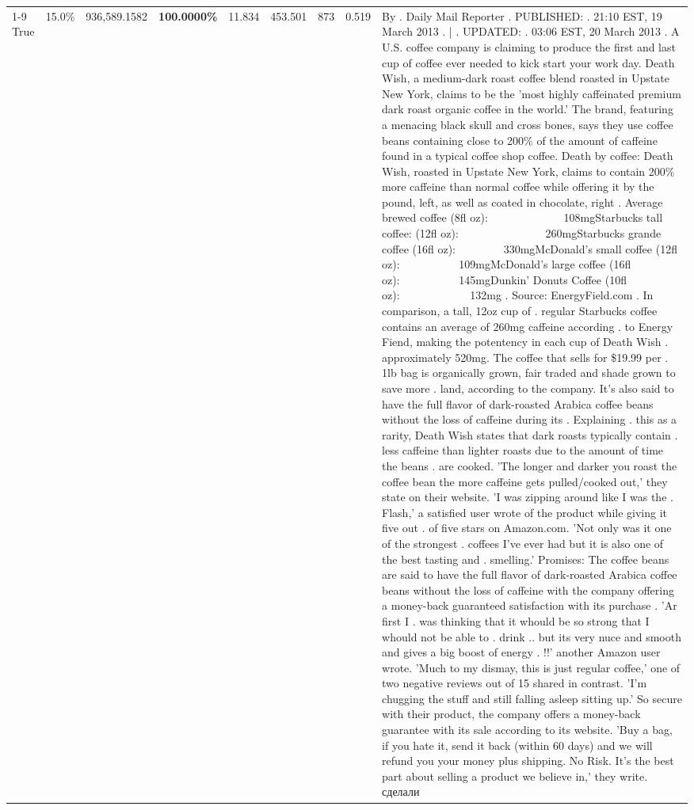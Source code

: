 \begin{table}[H]
{\begin{tabular}{lllrlllll}
\cline{1-9}
True & 15.0\% & 936,589.1582 & \bfseries \color{red} 100.0000\% & 11.834 & 453.501 & 873 & 0.519 & By . Daily Mail Reporter . PUBLISHED: . 21:10 EST, 19 March 2013 . | . UPDATED: . 03:06 EST, 20 March 2013 . A U.S. coffee company is claiming to produce the first and last cup of coffee ever needed to kick start your work day. Death Wish, a medium-dark roast coffee blend roasted in Upstate New York, claims to be the 'most highly caffeinated premium dark roast organic coffee in the world.' The brand, featuring a menacing black skull and cross bones, says they use coffee beans containing close to 200\% of the amount of caffeine found in a typical coffee shop coffee. Death by coffee: Death Wish, roasted in Upstate New York, claims to contain 200\% more caffeine than normal coffee while offering it by the pound, left, as well as coated in chocolate, right . Average brewed coffee (8fl oz):              108mgStarbucks tall coffee: (12fl oz):                260mgStarbucks grande coffee (16fl oz):         330mgMcDonald's small coffee (12fl oz):           109mgMcDonald's large coffee (16fl oz):           145mgDunkin' Donuts Coffee (10fl oz):             132mg . Source: EnergyField.com . In comparison, a tall, 12oz cup of . regular Starbucks coffee contains an average of 260mg caffeine according . to Energy Fiend, making the potentency in each cup of Death Wish . approximately 520mg. The coffee that sells for \$19.99 per . 1lb bag is organically grown, fair traded and shade grown to save more . land, according to the company. It's also said to have the full flavor of dark-roasted Arabica coffee beans without the loss of caffeine during its . Explaining . this as a rarity, Death Wish states that dark roasts typically contain . less caffeine than lighter roasts due to the amount of time the beans . are cooked. 'The longer and darker you roast the coffee bean the more caffeine gets pulled/cooked out,' they state on their website. 'I was zipping around like I was the . Flash,' a satisfied user wrote of the product while giving it five out . of five stars on Amazon.com. 'Not only was it one of the strongest . coffees I've ever had but it is also one of the best tasting and . smelling.’ Promises: The coffee beans are said to have the full flavor of dark-roasted Arabica coffee beans without the loss of caffeine with the company offering a money-back guaranteed satisfaction with its purchase . 'Ar first I . was thinking that it whould be so strong that I whould not be able to . drink .. but its very nuce and smooth and gives a big boost of energy . !!' another Amazon user wrote. 'Much to my dismay, this is just regular coffee,' one of two negative reviews out of 15 shared in contrast. 'I'm chugging the stuff and still falling asleep sitting up.' So secure with their product, the company offers a money-back guarantee with its sale according to its website. 'Buy a bag, if you hate it, send it back (within 60 days) and we will refund you your money plus shipping. No Risk. It’s the best part about selling a product we believe in,' they write. сделали \\

\end{tabular}}
\end{table}
